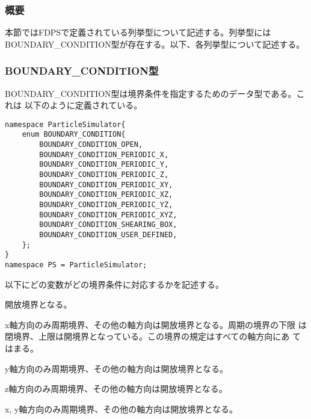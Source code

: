 \subsubsection{概要}

本節ではFDPSで定義されている列挙型について記述する。列挙型には
BOUNDARY\_CONDITION型が存在する。以下、各列挙型について記述する。

\subsubsection{BOUNDARY\_CONDITION型}
\label{sec:type_enum}


BOUNDARY\_CONDITION型は境界条件を指定するためのデータ型である。これは
以下のように定義されている。
\begin{lstlisting}[caption=boundarycondition]
namespace ParticleSimulator{
    enum BOUNDARY_CONDITION{
        BOUNDARY_CONDITION_OPEN,
        BOUNDARY_CONDITION_PERIODIC_X,
        BOUNDARY_CONDITION_PERIODIC_Y,
        BOUNDARY_CONDITION_PERIODIC_Z,
        BOUNDARY_CONDITION_PERIODIC_XY,
        BOUNDARY_CONDITION_PERIODIC_XZ,
        BOUNDARY_CONDITION_PERIODIC_YZ,
        BOUNDARY_CONDITION_PERIODIC_XYZ,
        BOUNDARY_CONDITION_SHEARING_BOX,
        BOUNDARY_CONDITION_USER_DEFINED,
    };
}
namespace PS = ParticleSimulator;
\end{lstlisting}

以下にどの変数がどの境界条件に対応するかを記述する。


開放境界となる。


x軸方向のみ周期境界、その他の軸方向は開放境界となる。周期の境界の下限
は閉境界、上限は開境界となっている。この境界の規定はすべての軸方向にあ
てはまる。


y軸方向のみ周期境界、その他の軸方向は開放境界となる。


z軸方向のみ周期境界、その他の軸方向は開放境界となる。


x, y軸方向のみ周期境界、その他の軸方向は開放境界となる。

